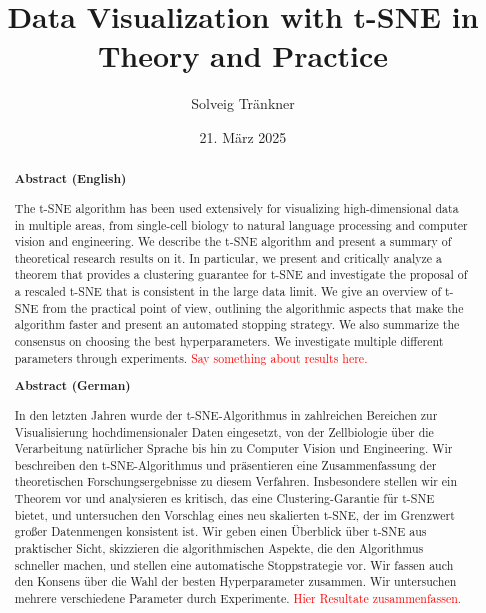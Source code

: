 \documentclass[paper=a4, fontsize=11pt, BCOR=13mm, DIV=13, headinclude, toc=index, toc=bibliography, english, twoside, parskip]{scrreprt}
\author{Solveig Tr\"ankner}
\date{21. M\"arz 2025}
\title{Data Visualization with t-SNE in Theory and Practice}
\theoremstyle{definition}               %
\theoremstyle{plain}
\begin{document}
\maketitle              %

\begin{abstract}
    \textbf{Abstract (English)}

    The t-SNE algorithm has been used extensively for visualizing high-dimensional data in multiple areas, from single-cell biology to natural language processing and computer vision and engineering. 
    We describe the t-SNE algorithm and present a summary of theoretical research results on it. 
    In particular, we present and critically analyze a theorem that provides a clustering guarantee for t-SNE and investigate the proposal of a rescaled t-SNE that is consistent in the large data limit. 
    We give an overview of t-SNE from the practical point of view, outlining the algorithmic aspects that make the algorithm faster and present an automated stopping strategy. 
    We also summarize the consensus on choosing the best hyperparameters. 
    We investigate multiple different parameters through experiments.
    \textcolor{red}{Say something about results here.}

    \vspace{2em}
    \textbf{Abstract (German)}

    In den letzten Jahren wurde der t-SNE-Algorithmus in zahlreichen Bereichen zur Visualisierung hochdimensionaler Daten eingesetzt, von der Zellbiologie über die Verarbeitung natürlicher Sprache bis hin zu Computer Vision und Engineering. 
    Wir beschreiben den t-SNE-Algorithmus und präsentieren eine Zusammenfassung der theoretischen Forschungs\-ergebnisse zu diesem Verfahren. 
    Insbesondere stellen wir ein Theorem vor und analysieren es kritisch, das eine Clustering-Garantie für t-SNE bietet, und untersuchen den Vorschlag eines neu skalierten t-SNE, der im Grenzwert großer Datenmengen konsistent ist. 
    Wir geben einen Überblick über t-SNE aus praktischer Sicht, skizzieren die algorithmischen Aspekte, die den Algorithmus schneller machen, und stellen eine automatische Stoppstrategie vor. 
    Wir fassen auch den Konsens über die Wahl der besten Hyperparameter zusammen. 
    Wir untersuchen mehrere verschiedene Parameter durch Experimente.
    \textcolor{red}{Hier Resultate zusammenfassen.}

\end{abstract}
\cleardoublepage
\end{document}
